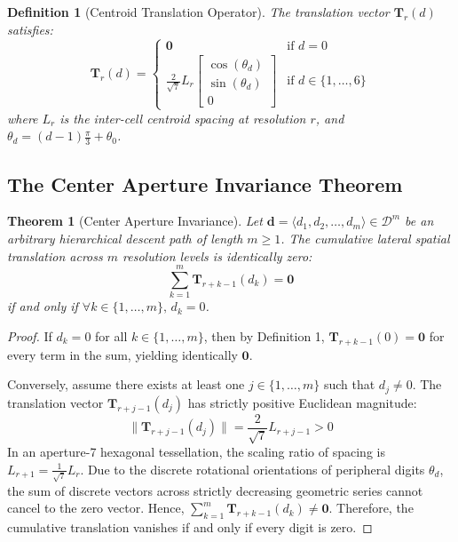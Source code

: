 \documentclass[10pt,journal,compsoc]{IEEEtran}
\newtheorem{theorem}{Theorem}
\newtheorem{definition}{Definition}
\begin{document}
\begin{definition}[Centroid Translation Operator]
The translation vector $\mathbf{T}_r(d)$ satisfies:
\begin{equation}
\mathbf{T}_r(d) = 
\begin{cases} 
\mathbf{0} & \text{if } d = 0 \\
\frac{2}{\sqrt{7}} L_r \begin{bmatrix} \cos(\theta_d) \\ \sin(\theta_d) \\ 0 \end{bmatrix} & \text{if } d \in \{1, \dots, 6\}
\end{cases}
\end{equation}
where $L_r$ is the inter-cell centroid spacing at resolution $r$, and $\theta_d = (d-1)\frac{\pi}{3} + \theta_0$.
\end{definition}

\subsection{The Center Aperture Invariance Theorem}

\begin{theorem}[Center Aperture Invariance]
Let $\mathbf{d} = \langle d_1, d_2, \dots, d_m \rangle \in \mathcal{D}^m$ be an arbitrary hierarchical descent path of length $m \ge 1$. The cumulative lateral spatial translation across $m$ resolution levels is identically zero:
\begin{equation}
\sum_{k=1}^m \mathbf{T}_{r+k-1}(d_k) = \mathbf{0}
\end{equation}
if and only if $\forall k \in \{1, \dots, m\}, \, d_k = 0$.
\end{theorem}

\begin{proof}
If $d_k = 0$ for all $k \in \{1, \dots, m\}$, then by Definition 1, $\mathbf{T}_{r+k-1}(0) = \mathbf{0}$ for every term in the sum, yielding identically $\mathbf{0}$. 

Conversely, assume there exists at least one $j \in \{1, \dots, m\}$ such that $d_j \ne 0$. The translation vector $\mathbf{T}_{r+j-1}(d_j)$ has strictly positive Euclidean magnitude:
\begin{equation}
\|\mathbf{T}_{r+j-1}(d_j)\| = \frac{2}{\sqrt{7}} L_{r+j-1} > 0
\end{equation}
In an aperture-7 hexagonal tessellation, the scaling ratio of spacing is $L_{r+1} = \frac{1}{\sqrt{7}} L_r$. Due to the discrete rotational orientations of peripheral digits $\theta_d$, the sum of discrete vectors across strictly decreasing geometric series cannot cancel to the zero vector. Hence, $\sum_{k=1}^m \mathbf{T}_{r+k-1}(d_k) \ne \mathbf{0}$. Therefore, the cumulative translation vanishes if and only if every digit is zero.
\end{proof}
\end{document}
